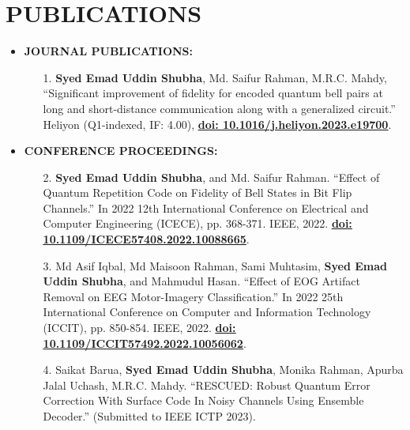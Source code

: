 \documentclass[letterpaper,11pt]{article}
\begin{document}
\section*{\textbf{PUBLICATIONS}}
\begin{itemize}[left=0cm]
\fontsize{9.6}{11.2}\selectfont
\item \textbf{JOURNAL PUBLICATIONS:}
\vspace{-0.5em} %
\begin{itemize}[left=0cm]
       \item [1.] \textbf{Syed Emad Uddin Shubha}, Md. Saifur Rahman, M.R.C. Mahdy, ``Significant improvement of fidelity for encoded quantum bell pairs at long and short-distance communication along with a generalized circuit.'' Heliyon (Q1-indexed, IF: 4.00),  \href{https://www.sciencedirect.com/science/article/pii/S2405844023069086}{\underline{\textbf{doi: 10.1016/j.heliyon.2023.e19700}}}.
    \end{itemize}
    \end{itemize}
\begin{itemize}[left=0cm]
\fontsize{9.6}{11.2}\selectfont
\item \textbf{CONFERENCE PROCEEDINGS:}
\vspace{-0.5em} %
    \begin{itemize}[left=0cm]
        \item [2.] \textbf{Syed Emad Uddin Shubha}, and Md. Saifur Rahman. ``Effect of Quantum Repetition Code on Fidelity of Bell States in Bit Flip Channels.'' In 2022 12th International Conference on Electrical and Computer Engineering (ICECE), pp. 368-371. IEEE, 2022.          \href{https://doi.org/10.1109/ICECE57408.2022.10088665}{\underline{\textbf{doi: 10.1109/ICECE57408.2022.10088665}}}. 
          
        \item [3.] Md Asif Iqbal, Md Maisoon Rahman, Sami Muhtasim, \textbf{Syed Emad Uddin Shubha}, and Mahmudul Hasan. ``Effect of EOG Artifact Removal on EEG Motor-Imagery Classification.'' In 2022 25th International Conference on Computer and Information Technology (ICCIT), pp. 850-854. IEEE, 2022.          \href{https://doi.org/10.1109/ICCIT57492.2022.10056062}{\underline{\textbf{doi: 10.1109/ICCIT57492.2022.10056062}}}.
      \item [4.] Saikat Barua, \textbf{Syed Emad Uddin Shubha}, Monika Rahman, Apurba Jalal Uchash, M.R.C. Mahdy. ``RESCUED: Robust Quantum Error Correction With Surface Code In Noisy Channels Using Ensemble Decoder.'' (Submitted to IEEE ICTP 2023).
    \end{itemize}
    \end{itemize}
\end{document}
